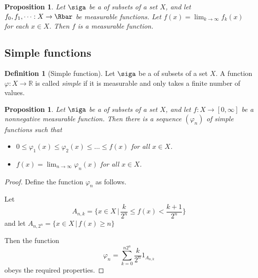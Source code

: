 \documentclass[10pt, oneside, reqno]{amsart}
\theoremstyle{plain}%
\newtheorem{prop}[thm]{Proposition}
\theoremstyle{definition}
\newtheorem{defn}[thm]{Definition}
\theoremstyle{remark}
\newcommand{\given}{ \, | \,}
\newcommand{\R}{\mathbb{R}}
\renewcommand{\phi}{\varphi}
\begin{document}
\begin{prop}
    Let $\siga$ be a \sig of subsets of a set $X$, and let $f_0, f_1,\dots : X \rightarrow \Rbar$ be measurable functions.  Let $f(x) = \lim_{k \rightarrow \infty} f_k(x)$ for each $x \in X$. Then $f$ is a measurable function.
\end{prop}  




\subsection{Simple functions} %
\label{sub:simple_functions}
\begin{defn}[Simple function]

    Let $\siga$ be a \sig of subsets of a set $X$.  A function $\phi : X \rightarrow \R$ is called \emph{simple} if it is measurable and only takes a finite number of values.
\end{defn}


\begin{prop}
    Let $\siga$ be a \sig of subsets of a set $X$, and let $f: X \rightarrow [0, \infty]$ be a nonnegative measurable function.  Then there is a sequence $(\phi_n)$ of simple functions such that 
    \begin{itemize}
        \item $0 \leq \phi_1(x) \leq \phi_2(x) \leq \dots \leq f(x)$ for all $x \in X$.
        \item $f(x) = \lim_{n \rightarrow \infty} \phi_n(x)$ for all $x \in X$.
    \end{itemize}
\end{prop}

\begin{proof}
    Define the function $\phi_n$ as follows.
    
    Let \[
        A_{n,k} = \{ x \in X \given \frac{k}{2^n} \leq f(x) < \frac{k+1}{2^n} \}
    \]
    and let $A_{n,2^n} = \{ x \in X \given f(x) \geq n \}$
    
    Then the function \[
        \phi_n  = \sum_{k=0}^{n2^n} \frac{k}{2^n}1_{A_{n,k}}
    \]
    obeys the required properties.
\end{proof}
\end{document}
